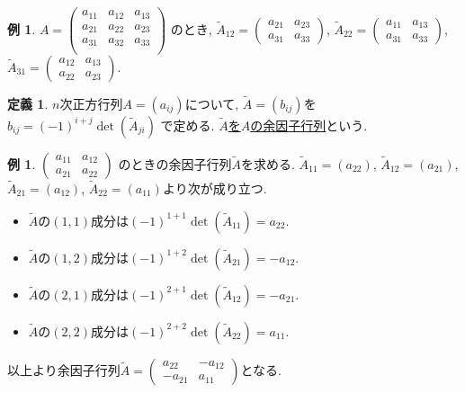 \documentclass[dvipdfmx,a4paper,11pt]{article}
\theoremstyle{definition}
\newtheorem{dfn}[thm]{定義}
\newtheorem{exa}[thm]{例}
\begin{document}
\begin{exa}
$
A=
\begin{pmatrix}
a_{11} & a_{12}&a_{13} \\
a_{21} & a_{22}&a_{23} \\
a_{31} & a_{32}&a_{33} \\
\end{pmatrix}
$
のとき, 
$  \tilde{A}_{12} =
\begin{pmatrix}
a_{21} & a_{23} \\
a_{31} & a_{33}
\end{pmatrix}
$, 
$  \tilde{A}_{22} =
\begin{pmatrix}
a_{11} & a_{13} \\
a_{31} & a_{33}
\end{pmatrix}
$, 
$  \tilde{A}_{31} =
\begin{pmatrix}
a_{12} & a_{13} \\
a_{22} & a_{23}
\end{pmatrix}
$.
\end{exa}

\begin{tcolorbox}[
    colback = white,
    colframe = green!35!black,
    fonttitle = \bfseries,
    breakable = true]
    \begin{dfn}
    $n$次正方行列$A=(a_{ij})$について, $\tilde{A} =(b_{ij})$を
    \underline{$
    b_{ij} = (-1)^{i+j} \det(\tilde{A}_{ji})$}
    で定める.
 \underline{$\tilde{A}$を$A$の余因子行列}という.
    \end{dfn}
 \end{tcolorbox}
\begin{exa}
\label{inverse_2}
$
\begin{pmatrix}
a_{11} & a_{12} \\
a_{21} & a_{22}
\end{pmatrix}
$
のときの余因子行列$\tilde{A} $を求める.
$  \tilde{A}_{11} =(a_{22})$, $  \tilde{A}_{12} =(a_{21})$, $  \tilde{A}_{21} =(a_{12})$, $  \tilde{A}_{22} =(a_{11})$より次が成り立つ.
\begin{itemize}
\item $\tilde{A} $の$(1,1)$成分は$(-1)^{1+1}\det( \tilde{A}_{11}) = a_{22}$.
\item $\tilde{A} $の$(1,2)$成分は$(-1)^{1+2}\det( \tilde{A}_{21}) = -a_{12}$.
\item $\tilde{A} $の$(2,1)$成分は$(-1)^{2+1}\det( \tilde{A}_{12}) = -a_{21}$.
\item $\tilde{A} $の$(2,2)$成分は$(-1)^{2+2}\det( \tilde{A}_{22}) = a_{11}$.
\end{itemize}
以上より余因子行列$\tilde{A} = 
\begin{pmatrix}
a_{22} &- a_{12} \\
-a_{21} & a_{11}
\end{pmatrix}$となる.
\end{exa}
\end{document}
